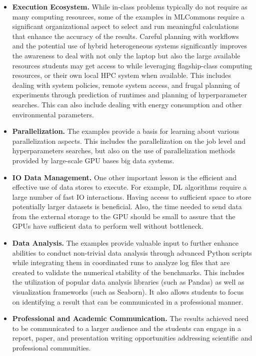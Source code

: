 \documentclass[utf8]{FrontiersinVancouver} %
\begin{document}
\begin{itemize}
  \item {\bf Execution Ecosystem.} While in-class problems typically
    do not require as many computing resources, some of the examples in
    MLCommons require a significant organizational aspect to select
    and run meaningful calculations that enhance the accuracy of the
    results. Careful planning with workflows and the potential use
    of hybrid heterogeneous systems significantly improves the
    awareness to deal with not only the laptop but also the large
    available resources students may get access to while leveraging
    flagship-class computing resources, or their own local HPC
    system when available. This includes dealing with system policies,
    remote system access, and frugal planning of experiments through
    prediction of runtimes and planning of hyperparameter searches. This
    can also include dealing with energy consumption and other
    environmental parameters.

  \item {\bf Parallelization.} The examples provide a basis for
    learning about various parallelization aspects. This includes the
    parallelization on the job level and hyperparameters searches, but
    also on the use of parallelization methods provided by large-scale
    GPU bases big data systems.

  \item {\bf IO Data Management.} One other important lesson is the
    efficient and effective use of data stores to execute.  For example,
    DL algorithms require a large number of fast IO interactions.
    Having access to sufficient space to store potentially larger datasets
    is beneficial. Also, the time needed to send data from the external
    storage to the GPU should be small to assure that the GPUs have
    sufficient data to perform well without bottleneck.

  \item {\bf Data Analysis.} The examples provide valuable input to
    further enhance abilities to conduct non-trivial data analysis
    through advanced Python scripts while integrating them in
    coordinated runs to analyze log files that are created to
    validate the numerical stability of the benchmarks. This 
    includes the utilization of popular data analysis libraries (such
    as Pandas) as well as visualization frameworks (such as Seaborn). It also allows students to
    focus on identifying a result that can be communicated in a
    professional manner.

  \item {\bf Professional and Academic Communication.} The results
    achieved need to be communicated to a larger audience and the
    students can engage in a report, paper, and
    presentation writing opportunities addressing scientific and
    professional communities.


\end{itemize}
\end{document}
